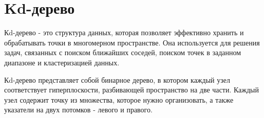 




\section{Kd-дерево}


Кd-дерево - это структура данных, которая позволяет эффективно хранить и обрабатывать точки в многомерном пространстве. Она используется для решения задач, связанных с поиском ближайших соседей, поиском точек в заданном диапазоне и кластеризацией данных.

Кd-дерево представляет собой бинарное дерево, в котором каждый узел соответствует гиперплоскости, разбивающей пространство на две части. Каждый узел содержит точку из множества, которое нужно организовать, а также указатели на двух потомков - левого и правого.


